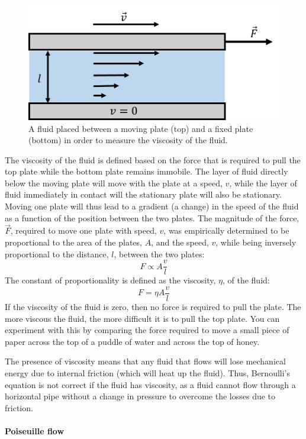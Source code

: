\begin{figure}[!htbp]
\centering
\includegraphics[width=0.5\linewidth]{files/viscosity-a79bba2b6d3a1371a42862b25a925a50.png}
\caption[]{A fluid placed between a moving plate (top) and a fixed plate (bottom) in order to measure the viscosity of the fluid.}
\label{fig:fluidmechanics:viscosity}
\end{figure}

The viscosity of the fluid is defined based on the force that is required to pull the top plate while the bottom plate remains immobile. The layer of fluid directly below the moving plate will move with the plate at a speed, $v$, while the layer of fluid immediately in contact will the stationary plate will also be stationary. Moving one plate will thus lead to a gradient (a change) in the speed of the fluid as a function of the position between the two plates. The magnitude of the force, $\vec F$,  required to move one plate with speed, $v$, was empirically determined to be proportional to the area of the plates, $A$, and the speed, $v$, while being inversely proportional to the distance, $l$, between the two plates:
\begin{equation}
F \propto A\frac{v}{l}
\end{equation}
The constant of proportionality is defined as the viscosity, $\eta$, of the fluid:
\begin{equation}
\boxed{F = \eta A\frac{v}{l}}
\end{equation}
If the viscosity of the fluid is zero, then no force is required to pull the plate. The more viscous the fluid, the more difficult it is to pull the top plate. You can experiment with this by comparing the force required to move a small piece of paper across the top of a puddle of water and across the top of honey.

The presence of viscosity means that any fluid that flows will lose mechanical energy due to internal friction (which will heat up the fluid). Thus, Bernoulli's equation is not correct if the fluid has viscosity, as a fluid cannot flow through a horizontal pipe without a change in pressure to overcome the losses due to friction.

\paragraph{Poiseuille flow}\label{sec:fluidmechanics:poiseuille}

